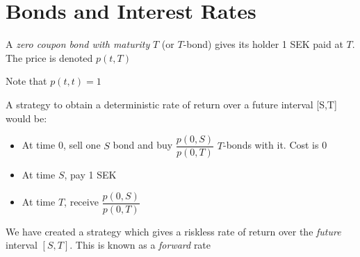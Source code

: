 \section{Bonds and Interest Rates}
\begin{defo}[]{}
  A \textit{zero coupon bond with maturity} $T$ (or $T$-bond) gives its holder 1 SEK paid at $T$. The price is denoted $p(t,T)$
\end{defo}\par
\noindent Note that $p(t,t) = 1$
\par\bigskip
\noindent A strategy to obtain a deterministic rate of return over a future interval [S,T] would be:\par
\begin{itemize}
  \item At time 0, sell one $S$ bond and buy $\dfrac{p(0,S)}{p(0,T)}$ $T$-bonds with it. Cost is 0
  \item At time $S$, pay 1 SEK
  \item At time $T$, receive $\dfrac{p(0,S)}{p(0,T)}$
\end{itemize}\par
\noindent We have created a strategy which gives a riskless rate of return over the \textit{future} interval $[S,T]$. This is known as a \textit{forward} rate
\par\bigskip
\noindent{}\par
